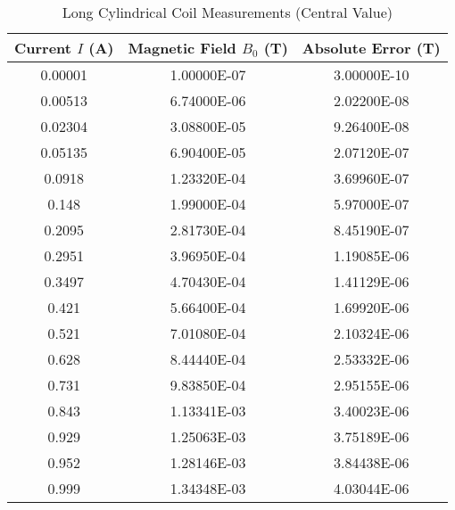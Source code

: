 \begin{appendix}
	\begin{table}[H]
		\centering
		\begin{tabular}{c|c|c}
			Current $I$ (A) & Magnetic Field $B_0$ (T) & Absolute Error (T) \\
			\hline\hline
			0.00001 & 1.00000E-07 & 3.00000E-10 \\ \hline
			0.00513 & 6.74000E-06 & 2.02200E-08 \\ \hline
			0.02304 & 3.08800E-05 & 9.26400E-08 \\ \hline
			0.05135 & 6.90400E-05 & 2.07120E-07 \\ \hline
			0.0918 & 1.23320E-04 & 3.69960E-07 \\ \hline
			0.148 & 1.99000E-04 & 5.97000E-07 \\ \hline
			0.2095 & 2.81730E-04 & 8.45190E-07 \\ \hline
			0.2951 & 3.96950E-04 & 1.19085E-06 \\ \hline
			0.3497 & 4.70430E-04 & 1.41129E-06 \\ \hline
			0.421 & 5.66400E-04 & 1.69920E-06 \\ \hline
			0.521 & 7.01080E-04 & 2.10324E-06 \\ \hline
			0.628 & 8.44440E-04 & 2.53332E-06 \\ \hline
			0.731 & 9.83850E-04 & 2.95155E-06 \\ \hline
			0.843 & 1.13341E-03 & 3.40023E-06 \\ \hline
			0.929 & 1.25063E-03 & 3.75189E-06 \\ \hline
			0.952 & 1.28146E-03 & 3.84438E-06 \\ \hline
			0.999 & 1.34348E-03 & 4.03044E-06 \\ \hline
		\end{tabular}
		\caption{Long Cylindrical Coil Measurements (Central Value)}
		\label{tab:Long_Cylindrical_Coil_Measurements_Central_Value}
	\end{table}


\end{appendix}
